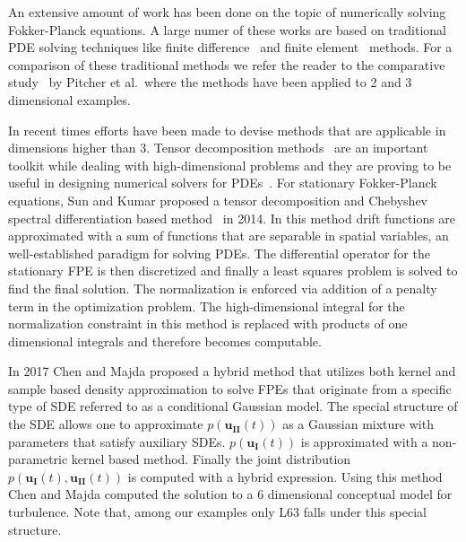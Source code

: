 An extensive amount of work has been done on the topic of numerically solving Fokker-Planck equations. A large numer of these works are based on traditional PDE solving techniques like finite difference~\cite{berezin1987conservative, whitney1970finite, sepehrian2015numerical} and finite element~\cite{naprstek2014finite, masud2005application} methods. For a comparison of these traditional methods we refer the reader to the comparative study~\cite{pichler2013numerical} by Pitcher et al.~where the methods have been applied to 2 and 3 dimensional examples. 


In recent times efforts have been made to devise methods that are applicable in dimensions higher than 3. Tensor decomposition methods~\cite{Hackbusch2005HierarchicalKT, kolda2009tensor} are an important toolkit while dealing with high-dimensional problems and they are proving to be useful in designing numerical solvers for PDEs~\cite{ballani2013projection, kressner2010krylov}.  For stationary Fokker-Planck equations, Sun and Kumar proposed a tensor decomposition and Chebyshev spectral differentiation based method~\cite{sun2014numerical} in 2014. In this method drift functions are approximated with a sum of functions that are separable in spatial variables, an well-established paradigm for solving PDEs. The differential operator for the stationary FPE is then discretized and finally a least squares problem is solved to find the final solution. The normalization is enforced via addition of a penalty term in the optimization problem. The high-dimensional integral for the normalization constraint in this method is replaced with  products of one dimensional integrals and therefore becomes computable.   

In 2017 Chen and Majda proposed a hybrid method \cite{chen2018efficient} that utilizes both kernel and sample based density approximation to solve FPEs that originate from a specific type of SDE referred to as a conditional Gaussian model.
The special structure of the SDE allows one to approximate $p(\mathbf{u_{II}}(t))$ as a Gaussian mixture with parameters that satisfy auxiliary SDEs. $p(\mathbf{u_I}(t))$ is approximated with a non-parametric kernel based method. Finally the joint distribution $p(\mathbf{u_I}(t), \mathbf{u_{II}}(t))$ is computed with a hybrid expression. Using this method Chen and Majda computed the solution to a 6 dimensional conceptual model for turbulence. Note that, among our examples only L63 falls under this special  structure.

